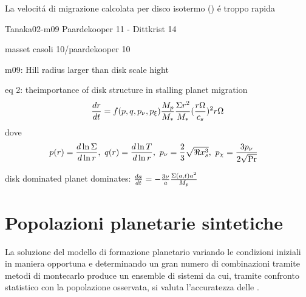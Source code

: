 \begin{workout}
La velocit\'a di migrazione calcolata per disco isotermo (\cite{tanaka2002}) \'e troppo rapida
\end{workout}

\begin{workout}
Tanaka02-m09
Paardekooper 11 - Dittkrist 14
\end{workout}

\begin{workout}
masset casoli 10/paardekooper 10
\end{workout}

\begin{workout}
m09: Hill radius larger than disk scale hight
\end{workout}

\begin{workout}
eq 2: theimportance of disk structure in stalling planet migration
\begin{equation}
\TDy{t}{r}=f(p,q,p_{\nu},p_{\xi})\frac{M_p}{M_*}\frac{\Sigma r^2}{M_*}(\frac{r\Omega}{c_s})^2r\Omega
\end{equation}
dove
\begin{align}
&p(r)=\TDly{r}{\Sigma},\ q(r)=\TDly{r}{T},\ p_{\nu}=\frac{2}{3}\sqrt{\Re x_s^3},\ p_{\chi}=\frac{3p_{\nu}}{2\sqrt{\Pr}}
\end{align}
\end{workout}

\begin{workout}
disk dominated
planet dominates: $\TDy{t}{a}=-\frac{3\nu}{a}\frac{\Sigma(a,t)a^2}{M_p}$
\end{workout}

\section{Popolazioni planetarie sintetiche}
\begin{errata}
La soluzione del modello di formazione planetario variando le condizioni iniziali in maniera opportuna e determinando un gran numero di combinazioni tramite metodi di montecarlo produce un ensemble di sistemi da cui, tramite confronto statistico con la popolazione osservata, si valuta l'accuratezza delle .
\end{errata}

